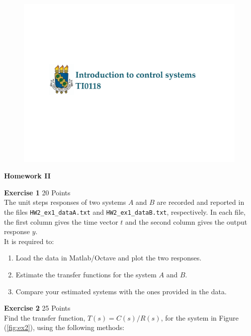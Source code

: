 \documentclass[a4paper,11pt]{article}
\begin{document}
\begin{figure}[!h] \includegraphics [scale=0.3] {Course-name} \end{figure}
{\Large \noindent \bf Homework II} 

\vskip0.8cm

{\Large \noindent \bf Exercise 1} \hfill					20 Points\\

\noindent The unit steps responses of two systems $A$ and $B$ are recorded and reported in the files {\tt HW2\_ex1\_dataA.txt} and  {\tt HW2\_ex1\_dataB.txt}, respectively. In each file, the first column gives the time vector $t$ and the second column gives the output response $y$. \\

\noindent It is required to:
\begin{enumerate}
\item Load the data in Matlab/Octave and plot the two responses.
\item Estimate the transfer functions for the system $A$ and $B$. 
\item Compare your estimated systems with the ones provided in the data.
\end{enumerate}

\vskip0.5cm

{\Large \noindent \bf Exercise 2} \hfill					25 Points\\

\noindent Find the transfer function, $T(s)=C(s)/R(s)$, for the system in Figure (\ref{fig:ex2}), using the following methods:
\end{document}
